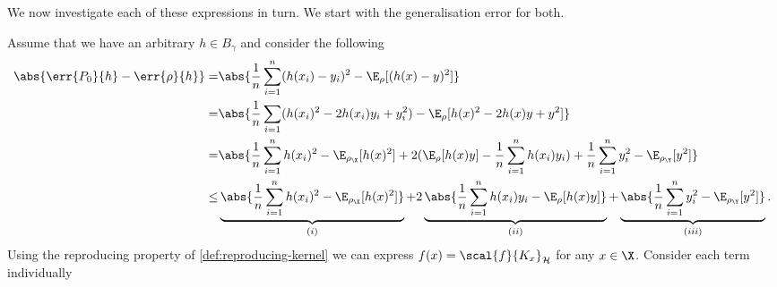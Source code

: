 We now investigate each of these expressions in turn. We start with the
generalisation error for both.

Assume that we have an arbitrary \(h \in B_{\gamma}\) and consider the following
\begin{align*}
  \abs{\err{\poolset_0}{h} - \err{\rho}{h}} = & \abs{\frac{1}{n} \sum_{i=1}^{n}(h(x_i) - y_i)^2 - \E_{\rho}[(h(x) - y)^2]} \\
                                            = & \abs{\frac{1}{n} \sum_{i=1}(h(x_i)^2 - 2h(x_i)y_i + y_i^2) - \E_{\rho}[h(x)^2 - 2h(x)y + y^2]} \\
                                            = & \abs{\frac{1}{n} \sum_{i=1}^nh(x_i)^2 - \E_{\rho_{\X}}[h(x)^2] + 2(\E_{\rho}[h(x)y] - \frac{1}{n} \sum_{i=1}^n h(x_i)y_i) + \frac{1}{n} \sum_{i=1}^n y_i^2 - \E_{\rho_{\Y}}[y^2]} \\
                                            \leq & \underbrace{\abs{\frac{1}{n} \sum_{i=1}^nh(x_i)^2 - \E_{\rho_{\X}}[h(x)^2]}}_{(i)} + 2 \underbrace{\abs{\frac{1}{n} \sum_{i=1}^n h(x_i)y_i - \E_{\rho}[h(x)y]}}_{(ii)} + \underbrace{\abs{\frac{1}{n} \sum_{i=1}^n y_i^2 - \E_{\rho_{\Y}}[y^2]}}_{(iii)}.
\end{align*}
Using the reproducing property of \ref{def:reproducing-kernel} we can express
\(f(x) = \scal{f}{K_{x}}_{\rkhs{H}}\) for any \(x \in \X\). Consider each term
individually

